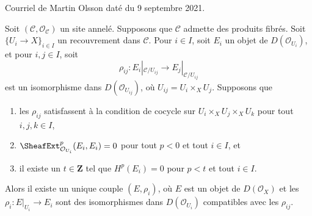 \begin{lemma}
\label{lemma-bbd-glueing-cech}
\begin{reference}
Courriel de Martin Olsson daté du 9 septembre 2021.
\end{reference}
Soit $(\mathcal{C}, \mathcal{O}_\mathcal{C})$ un site annelé.
Supposons que $\mathcal{C}$ admette des produits fibrés.
Soit $\{U_i \to X\}_{i \in I}$ un recouvrement dans $\mathcal{C}$.
Pour $i \in I$, soit $E_i$ un objet de $D(\mathcal{O}_{U_i})$, et
pour $i, j \in I$, soit
$$
\rho_{ij} : E_i|_{\mathcal{C}/U_{ij}} \longrightarrow E_j|_{\mathcal{C}/U_{ij}}
$$
est un isomorphisme dans $D(\mathcal{O}_{U_{ij}})$, où
$U_{ij} = U_i \times_X U_j$. Supposons que
\begin{enumerate}
\item les $\rho_{ij}$ satisfassent à la condition de cocycle sur
$U_i \times_X U_j \times_X U_k$ pour tout $i, j, k \in I$,
\item $\SheafExt^p_{\mathcal{O}_{U_i}}(E_i, E_i) = 0$
pour tout $p < 0$ et tout $i \in I$, et
\item il existe un $t \in \mathbf{Z}$ tel que
$H^p(E_i) = 0$ pour $p < t$ et tout $i \in I$.
\end{enumerate}
Alors il existe un unique couple $(E, \rho_i)$, où $E$ est un objet de
$D(\mathcal{O}_X)$ et les $\rho_i : E|_{U_i} \to E_i$ sont des isomorphismes dans
$D(\mathcal{O}_{U_i})$ compatibles avec les $\rho_{ij}$.
\end{lemma}

